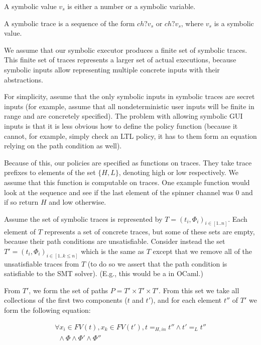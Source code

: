 \documentclass[conference]{IEEEtran}
\newcommand{\code}[1]{\text{\lstinline!#1!}}
\theoremstyle{definition}
\newcommand{\tr}{t\xspace}
\begin{document}
\begin{Definition}
  A symbolic value $v_s$ is either a number or a symbolic variable.

  A symbolic trace is a sequence of the form $ch?v_s$ or $ch?v_s$,
  where $v_s$ is a symbolic value.
    
\end{Definition}

We assume that our symbolic executor produces a finite set of symbolic
traces.  This finite set of traces represents a larger set of actual
executions, because symbolic inputs allow representing multiple
concrete inputs with their abstractions.

For simplicity, assume that the only symbolic inputs in symbolic
traces are secret inputs (for example, assume that all
nondeterministic user inputs will be finite in range and are
concretely specified).  The problem with allowing symbolic GUI inputs
is that it is less obvious how to define the policy function (because
it cannot, for example, simply check an LTL policy, it has to them
form an equation relying on the path condition as well).

Because of this, our policies are specified as functions on traces.
They take trace prefixes to elements of the set $\{H,L\}$, denoting
high or low respectively.  We assume that this function is computable
on traces.  One example function would look at the sequence and see if
the last element of the spinner channel \code{id_s} was $0$ and if so
return $H$ and low otherwise.

Assume the set of symbolic traces is represented by $T =
(\tr_i,\Phi_i)_{i \in [1..n]}$.  Each element of $T$ represents a set
of concrete traces, but some of these sets are empty, because their
path conditions are unsatisfiable.  Consider instead the set $T' =
(\tr_i,\Phi_i)_{i \in [1..k \leq n]}$ which is the same as $T$ except
that we remove all of the unsatisfiable traces from $T$ (to do so we
assert that the path condition is satisfiable to the SMT solver).
(E.g., this would be a \code{filter(is_sat)} in OCaml.)

From $T'$, we form the set of paths $P = T' \times T' \times T'$.
From this set we take all collections of the first two components
($\tr$ and $\tr'$), and for each element $\tr''$ of $T'$ we form the
following equation:

\begin{displaymath}
  \begin{array}{l}
    \forall x_i \in FV(\tr), x_k \in FV(\tr'), \tr =_{H,in} \tr''
    \land \tr' =_L \tr'' \\
    ~~\land \Phi \land \Phi' \land \Phi''
  \end{array}
\end{displaymath}
\end{document}
